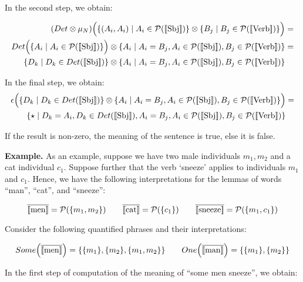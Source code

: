 \documentclass[a4paper,11pt]{easychair}
\begin{document}
\noindent
In the second step, we obtain:

\begin{align*}
(Det \otimes  \mu_N)\Big(\{(A_i, A_i) \mid A_i \in {\cal P} (\semantics{\text{Sbj}})\} \otimes \{B_j \mid B_j \in  {\cal P} (\semantics{\text{Verb}})\}\Big) &=\\
Det\Big(\{A_i \mid A_i \in {\cal P} (\semantics{\text{Sbj}})\}\Big) \otimes \{A_i \mid A_i = B_j, A_i \in {\cal P} (\semantics{\text{Sbj}}), B_j \in  {\cal P}(\semantics{\text{Verb}})\} &=\\
\{D_k \mid D_k \in Det(\semantics{\text{Sbj}})\} \otimes \{A_i \mid A_i = B_j, A_i \in {\cal P} (\semantics{\text{Sbj}}), B_j \in  {\cal P}(\semantics{\text{Verb}})\}
\end{align*}

\noindent
In the final step, we obtain:
\begin{align*}
\epsilon\Big(\{D_k \mid D_k \in Det(\semantics{\text{Sbj}})\} \otimes \{A_i \mid A_i = B_j, A_i \in {\cal P} (\semantics{\text{Sbj}}), B_j \in  {\cal P}(\semantics{\text{Verb}})\}\Big) &=\\
 \{\star \mid  D_k = A_i, D_k \in Det(\semantics{\text{Sbj}}), A_i = B_j, A_i \in {\cal P} (\semantics{\text{Sbj}}), B_j \in  {\cal P} (\semantics{\text{Verb}})\}
\end{align*}


\noindent
If the result is non-zero, the meaning of the sentence is true, else it is false. 


\medskip
\noindent
{\bf Example.} 
As an  example,  suppose we have two male individuals $m_1, m_2$  and a cat   individual $c_1$.  Suppose further that  the verb `sneeze'  applies to individuals $m_1$ and $c_1$. Hence, we have the following interpretations for the lemmas of words ``man'', ``cat'', and ``sneeze'':

\[
\overline{[\![ \text{men} ]\!]} =  {\cal P}(\{m_1, m_2\})  \qquad
\overline{[\![ \text{cat} ]\!]} =  {\cal P}(\{c_1\})  \qquad
\overline{[\![ \text{sneeze} ]\!]} = {\cal P}(\{m_1, c_1\})
\]

\noindent
Consider the  following quantified phrases and their interpretations:

\[
Some\Big(\overline{[\![ \text{men} ]\!]}\Big) =  \{\{m_1\}, \{m_2\}, \{m_1, m_2\}\} \qquad
One\Big(\overline{[\![ \text{man} ]\!]}\Big) = \{\{m_1\}, \{m_2\}\}\]

\noindent
In the first step of computation of the meaning of  ``some men sneeze'', we obtain:
\end{document}

